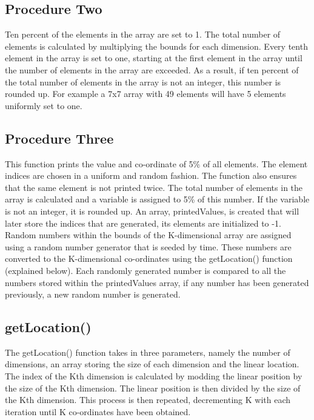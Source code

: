 \documentclass[10pt,onecolumn]{article}
\begin{document}
\subsection*{Procedure Two}
Ten percent of the elements in the array are set to 1. The total number of elements is calculated by multiplying the bounds for each dimension. Every tenth element in the array is set to one, starting at the first element in the array until the number of elements in the array are exceeded. As a result, if ten percent of the total number of elements in the array is not an integer, this number is rounded up. For example a 7x7 array with 49 elements will have 5 elements uniformly set to one.

\subsection*{Procedure Three}
This function prints the value and co-ordinate of 5\% of all elements. The element indices are chosen in a uniform and random fashion. The function also ensures that the same element is not printed twice. The total number of elements in the array is calculated and a variable is assigned to 5\% of this number. If the variable is not an integer, it is rounded up. An array, printedValues, is created that will later store the indices that are generated, its elements are initialized to -1. Random numbers within the bounds of the K-dimensional array are assigned using a random number generator that is seeded by time. These numbers are converted to the K-dimensional co-ordinates using the getLocation() function (explained below). Each randomly generated number is compared to all the numbers stored within the printedValues array, if any number has been generated previously, a new random number is generated. \\

\subsection*{getLocation()}
The getLocation() function takes in three parameters, namely the number of dimensions, an array storing the size of each dimension and the linear location. The index of the Kth dimension is calculated by modding the linear position by the size of the Kth dimension. The linear position is then divided by the size of the Kth dimension. This process is then repeated, decrementing K with each iteration until K co-ordinates have been obtained. \\
\end{document}
